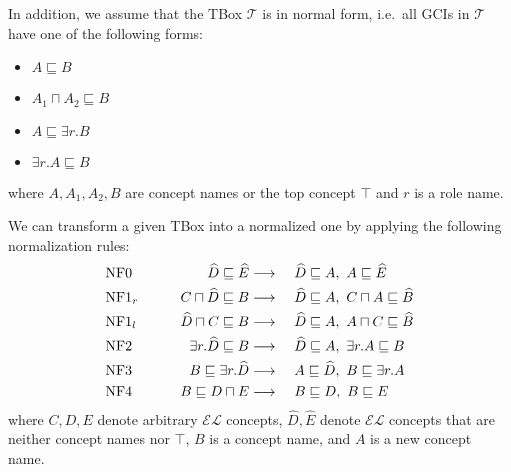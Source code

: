 In addition, we assume that the TBox $\mathcal{T}$ is in normal form,
i.e.\ all GCIs in $\mathcal{T}$ have one of the following forms:
\begin{itemize}
	\item $A \sqsubseteq B$
	\item $A_1 \sqcap A_2 \sqsubseteq B$
	\item $A \sqsubseteq \exists r.B$
	\item $\exists r. A \sqsubseteq B$
\end{itemize}
where $A, A_1, A_2, B$ are concept names or the top concept $\top$ and $r$ is a role name.
\begin{mdframed}[frametitle= Normalisation of an $\mathcal{EL}$ TBox]
	We can transform a given TBox into a normalized one by applying the following normalization rules:
	\begin{alignat*}{3}
		&\var{NF0} \qquad& \widehat{D} \sqsubseteq \widehat{E} &\longrightarrow\ &&\widehat{D} \sqsubseteq A,\ A \sqsubseteq \widehat{E} \\
		&\var{NF1}_r \qquad& C \sqcap \widehat{D} \sqsubseteq B &\longrightarrow\ &&\widehat{D} \sqsubseteq A,\ C \sqcap A \sqsubseteq \widehat{B} \\
		&\var{NF1}_l \qquad& \widehat{D} \sqcap C \sqsubseteq B &\longrightarrow\ &&\widehat{D} \sqsubseteq A,\ A \sqcap C \sqsubseteq \widehat{B} \\
		&\var{NF2} \qquad& \exists r.\widehat{D} \sqsubseteq B &\longrightarrow\ &&\widehat{D} \sqsubseteq A,\ \exists r.A \sqsubseteq B\\
		&\var{NF3} \qquad& B \sqsubseteq \exists r. \widehat{D} &\longrightarrow\ && A \sqsubseteq \widehat{D},\ B \sqsubseteq \exists r.A \\
		&\var{NF4} \qquad & B \sqsubseteq D \sqcap E &\longrightarrow\ && B \sqsubseteq D,\ B \sqsubseteq E
	\end{alignat*}
	where $C, D, E$ denote arbitrary $\mathcal{EL}$ concepts,
	$\widehat{D}, \widehat{E}$ denote $\mathcal{EL}$ concepts that are neither concept names nor $\top$,
	$B$ is a concept name, and $A$ is a new concept name.
\end{mdframed}

